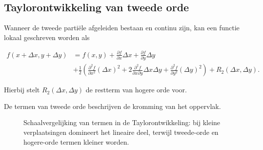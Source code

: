 \documentclass[11pt,a4paper]{article}
\begin{document}
    \subsection{Taylorontwikkeling van tweede orde}

    Wanneer de tweede partiële afgeleiden bestaan en continu zijn,
    kan een functie lokaal geschreven worden als

    \[
        \begin{aligned}
            f(x+\Delta x, y+\Delta y)
            &=
            f(x,y)
            +
            \frac{\partial f}{\partial x}\Delta x
            +
            \frac{\partial f}{\partial y}\Delta y \\
            &+
            \frac{1}{2}
            \left(
                \frac{\partial^2 f}{\partial x^2}(\Delta x)^2
            +
            2\frac{\partial^2 f}{\partial x \partial y}\Delta x \Delta y
            +
                \frac{\partial^2 f}{\partial y^2}(\Delta y)^2
            \right)
            +
            R_2(\Delta x,\Delta y).
        \end{aligned}
    \]

    Hierbij stelt $R_2(\Delta x,\Delta y)$ de restterm van hogere orde voor.

    De termen van tweede orde beschrijven de kromming van het oppervlak.

    \begin{figure}[htbp]
        \centering
        \caption{Schaalvergelijking van termen in de Taylorontwikkeling: bij kleine verplaatsingen domineert het lineaire deel, terwijl tweede-orde en hogere-orde termen kleiner worden.}
        \label{fig:taylor-orde-termen}
    \end{figure}
\end{document}
